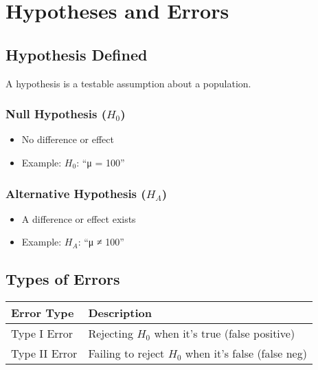 \documentclass[
  letterpaper,
  DIV=11,
  numbers=noendperiod]{scrreprt}
\providecommand{\tightlist}{%
  \setlength{\itemsep}{0pt}\setlength{\parskip}{0pt}}
\begin{document}
\section{Hypotheses and Errors}\label{hypotheses-and-errors}

\subsection{Hypothesis Defined}\label{hypothesis-defined}

A hypothesis is a testable assumption about a population.

\subsubsection{\texorpdfstring{Null Hypothesis
(\(H_0\))}{Null Hypothesis (H\_0)}}\label{null-hypothesis-h_0}

\begin{itemize}
\tightlist
\item
  No difference or effect\\
\item
  Example: \(H_0\): ``μ = 100''
\end{itemize}

\subsubsection{\texorpdfstring{Alternative Hypothesis
(\(H_A\))}{Alternative Hypothesis (H\_A)}}\label{alternative-hypothesis-h_a}

\begin{itemize}
\tightlist
\item
  A difference or effect exists\\
\item
  Example: \(H_A\): ``μ ≠ 100''
\end{itemize}

\subsection{Types of Errors}\label{types-of-errors}

\begin{longtable}[]{@{}ll@{}}
\toprule\noalign{}
Error Type & Description \\
\midrule\noalign{}
\endhead
\bottomrule\noalign{}
\endlastfoot
Type I Error & Rejecting \(H_0\) when it's true (false positive) \\
Type II Error & Failing to reject \(H_0\) when it's false (false neg) \\
\end{longtable}
\end{document}
